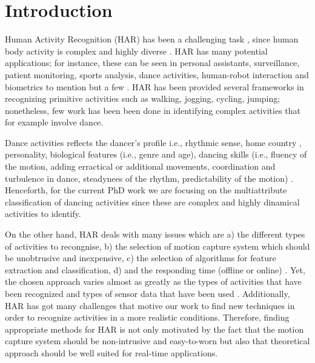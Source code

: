 
\chapter{Introduction}  %

\ifpdf
    \graphicspath{{Chapter1/Figs/Raster/}{Chapter1/Figs/PDF/}{Chapter1/Figs/}}
\else
    \graphicspath{{Chapter1/Figs/Vector/}{Chapter1/Figs/}}
\fi

Human Activity Recognition (HAR) has been a challenging task \cite{Aggarwal2004}, 
since human body activity is complex and highly diverse \cite{Kim2010}.
HAR has many potential applications; for instance, these can be seen in personal 
assistants, surveillance, patient monitoring, sports analysis, dance activities, 
human-robot interaction and biometrics to mention but a few \cite{Aggarwal2011}. 
HAR has been provided several frameworks in recognizing primitive activities 
such as walking, jogging, cycling, jumping; nonetheless, few work has been been
done in identifying complex activities that for example involve dance. 

Dance activities reflects the dancer's profile i.e., rhythmic sense, 
home country \cite{Iwai2011}, personality, biological features (i.e., genre and age),
dancing skills (i.e., fluency of the motion, adding erractical or additional movements,
coordination and turbulence in dance, steadynees of the rhythm, predictability of 
the motion) \cite{GrammerK.ElisabethOberzaucher2011}.
Henceforth, for the current PhD work
we are focusing on the multiattribute classification of dancing activities 
since these are complex and  highly dinamical activities to identify.

On the other hand, HAR deals with many issues which are
a) the different types of activities to recongnise,
b) the selection of motion capture system which should be unobtrusive and inexpensive,
c) the selection of algorithms for feature extraction and classification,
d) and the responding time (offline or online) \cite{Lara2013}.
Yet, the chosen approach varies almost as greatly as the types of activities 
that have been recognized and types of sensor data that have been used 
\cite{Kim2010}. Additionally, HAR has got many challenges that motive our work 
to find new techniques in order to recognize activities in a more realistic conditions. 
Therefore, finding appropriate methods for HAR is not only motivated by the 
fact that the motion capture system should be non-intrusive and easy-to-worn 
but also that theoretical approach should be well suited for real-time applications.

